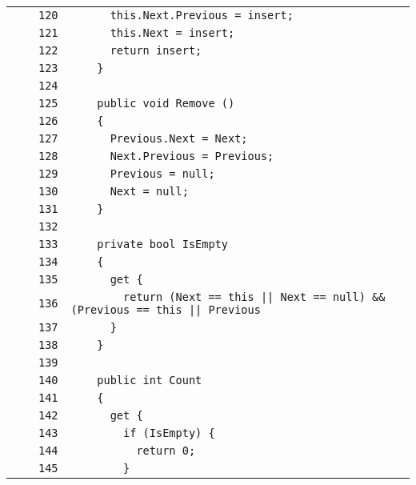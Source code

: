 \documentclass[a4paper,10pt]{article}
\begin{document}
\begin{longtable}[l]{lrrl}
\cellcolor{gray} &  & \verb~120~ & \verb~      this.Next.Previous = insert;~\\
\cellcolor{gray} &  & \verb~121~ & \verb~      this.Next = insert;~\\
\cellcolor{gray} &  & \verb~122~ & \verb~      return insert;~\\
\cellcolor{gray} &  & \verb~123~ & \verb~    }~\\
\cellcolor{gray} &  & \verb~124~ & \verb~~\\
\cellcolor{gray} &  & \verb~125~ & \verb~    public void Remove ()~\\
\cellcolor{gray} &  & \verb~126~ & \verb~    {~\\
\cellcolor{gray} &  & \verb~127~ & \verb~      Previous.Next = Next;~\\
\cellcolor{gray} &  & \verb~128~ & \verb~      Next.Previous = Previous;~\\
\cellcolor{gray} &  & \verb~129~ & \verb~      Previous = null;~\\
\cellcolor{gray} &  & \verb~130~ & \verb~      Next = null;~\\
\cellcolor{gray} &  & \verb~131~ & \verb~    }~\\
\cellcolor{gray} &  & \verb~132~ & \verb~~\\
\cellcolor{gray} &  & \verb~133~ & \verb~    private bool IsEmpty~\\
\cellcolor{gray} &  & \verb~134~ & \verb~    {~\\
\cellcolor{gray} &  & \verb~135~ & \verb~      get {~\\
\cellcolor{gray} &  & \verb~136~ & \verb~        return (Next == this || Next == null) && (Previous == this || Previous~\\
\cellcolor{gray} &  & \verb~137~ & \verb~      }~\\
\cellcolor{gray} &  & \verb~138~ & \verb~    }~\\
\cellcolor{gray} &  & \verb~139~ & \verb~~\\
\cellcolor{gray} &  & \verb~140~ & \verb~    public int Count~\\
\cellcolor{gray} &  & \verb~141~ & \verb~    {~\\
\cellcolor{gray} &  & \verb~142~ & \verb~      get {~\\
\cellcolor{gray} &  & \verb~143~ & \verb~        if (IsEmpty) {~\\
\cellcolor{gray} &  & \verb~144~ & \verb~          return 0;~\\
\cellcolor{gray} &  & \verb~145~ & \verb~        }~\\

\end{longtable}
\end{document}
